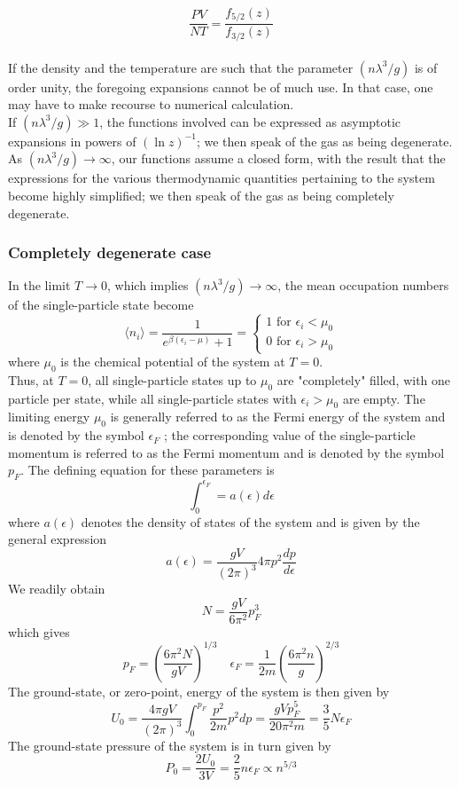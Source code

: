 \documentclass[cyan]{elegantnote}
\begin{document}
\[\frac{PV}{NT} = \frac{f_{5/2}(z)}{f_{3/2}(z)}\]
\\
If the density and the temperature are such that the parameter $(n\lambda^3/g)$ is of order unity, the foregoing expansions cannot be of much use. In that case, one may have to make recourse to numerical calculation.
\\
If $(n\lambda^3/g) \gg 1$, the functions involved can be expressed as asymptotic expansions in powers of $(\ln z)^{-1}$; we then speak of the gas as being degenerate.
\\
As $(n\lambda^3/g) \to \infty$, our functions assume a closed form, with the result that the expressions for the various thermodynamic quantities pertaining to the system become highly simplified; we then speak of the gas as being completely degenerate.

\subsubsection{Completely degenerate case}
In the limit $T \to 0$, which implies $(n\lambda^3/g) \to \infty$, the mean occupation numbers of the single-particle state become
\[\langle n_i \rangle = \frac{1}{e^{\beta(\epsilon_i - \mu)} + 1} = \begin{cases}1 \mbox{ for } \epsilon_i < \mu_0 \\   0 \mbox{ for } \epsilon_i > \mu_0 \end{cases}\]
where $\mu_0$ is the chemical potential of the system at $T = 0$.
\\
Thus, at $T = 0$, all single-particle states up to $\mu_0$ are "completely" filled, with one particle per state, while all single-particle states with $\epsilon_i > \mu_0$ are empty. 
The limiting energy $\mu_0$ is generally referred to as the Fermi energy of the system and is denoted by the symbol $\epsilon_F$ ; the corresponding value of the single-particle momentum is referred to as the Fermi momentum and is denoted by the symbol $p_F$. The defining equation for these parameters is
\[\int_0^{\epsilon_F} = a(\epsilon)d\epsilon\]
where $a(\epsilon)$ denotes the density of states of the system and is given by the general expression
\[a(\epsilon) = \frac{gV}{(2\pi)^3} 4\pi p^2 \frac{dp}{d\epsilon}\]
We readily obtain
\[N = \frac{gV}{6\pi^2} p_F^3\]
which gives
\[p_F = \left( \frac{6\pi^2N}{gV} \right)^{1/3} \quad \epsilon_F = \frac{1}{2m}\left( \frac{6\pi^2n}{g} \right)^{2/3}\]
The ground-state, or zero-point, energy of the system is then given by
\[U_0 = \frac{4\pi gV}{(2\pi)^3} \int_0^{p_F} \frac{p^2}{2m} p^2 dp = \frac{gVp_F^5}{20\pi^2m} = \frac{3}{5}N\epsilon_F\]
The ground-state pressure of the system is in turn given by
\[P_0 = \frac{2U_0}{3V} = \frac{2}{5}n\epsilon_F \propto n^{5/3}\]
\end{document}
